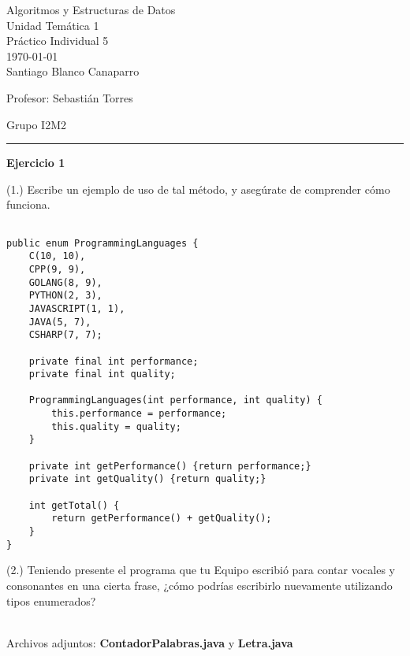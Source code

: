 \documentclass[12pt,letterpaper, onecolumn]{exam}
\begin{document}
\begingroup  
    \centering
    \LARGE Algoritmos y Estructuras de Datos\\
    \large Unidad Temática 1\\
    \large Práctico Individual 5\\[0.5em]
    \normalsize \today\\[0.5em]
    \normalsize Santiago Blanco Canaparro\par
    \normalsize Profesor: Sebastián Torres\par
    \normalsize Grupo I2M2\par
\endgroup
\rule{\textwidth}{0.4pt}
\pointsdroppedatright   %
\printanswers
\renewcommand{\solutiontitle}{\noindent\textbf{Respuesta:}\enspace}   %

\begin{questions}

  \question[] \textbf{Ejercicio 1}\droppoints
    
(1.) Escribe un ejemplo de uso de tal método, y asegúrate de comprender cómo funciona.
\vspace{-8mm}
    \begin{solution}
      \begin{verbatim}

public enum ProgrammingLanguages {
    C(10, 10),
    CPP(9, 9),
    GOLANG(8, 9),
    PYTHON(2, 3),
    JAVASCRIPT(1, 1),
    JAVA(5, 7),
    CSHARP(7, 7);

    private final int performance;
    private final int quality;

    ProgrammingLanguages(int performance, int quality) {
        this.performance = performance;
        this.quality = quality;
    }

    private int getPerformance() {return performance;}
    private int getQuality() {return quality;}

    int getTotal() {
        return getPerformance() + getQuality();
    }
}
      \end{verbatim}
          \end{solution}

(2.) Teniendo presente el programa que tu Equipo escribió
para contar vocales y
consonantes en una cierta frase, ¿cómo podrías escribirlo nuevamente utilizando tipos
enumerados?
    \begin{solution}
      \\
      Archivos adjuntos: \textbf{ContadorPalabras.java} y \textbf{Letra.java}
        \end{solution}
        

\end{questions}
\end{document}
